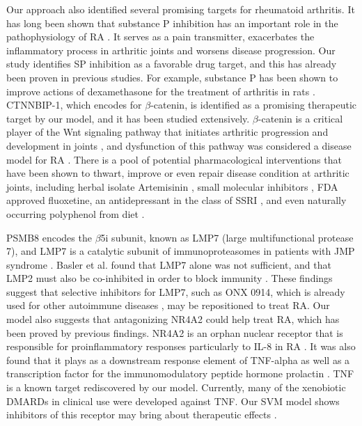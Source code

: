     Our approach also identified several promising targets for rheumatoid arthritis. It has long been shown that substance P inhibition has an important role in the pathophysiology of RA \cite{lisowska2015substance,garrett1992role,green2005gastrin,keeble2004role,lotz1987substance,okamura2017dual,lam1990mediators,lam1991neurogenic}. It serves as a pain transmitter, exacerbates the inflammatory process in arthritic joints and worsens disease progression. Our study identifies SP inhibition as a favorable drug target, and this has already been proven in previous studies. For example, substance P has been shown to improve actions of dexamethasone for the treatment of arthritis in rats \cite{lam2010substance}. CTNNBIP-1, which encodes for $\beta$-catenin, is identified as a promising therapeutic target by our model, and it has been studied extensively. $\beta$-catenin is a critical player of the Wnt signaling pathway that initiates arthritic progression and development in joints \cite{sen2005wnt,zhou2017wnt}, and dysfunction of this pathway was considered a disease model for RA \cite{wu2010beta,zhou2017wnt}. There is a pool of potential pharmacological interventions that have been shown to thwart, improve or even repair disease condition at arthritic joints, including herbal isolate Artemisinin \cite{zhong2018artemisinin}, small molecular inhibitors \cite{lietman2018inhibition,landman2013small,landman2013small,dell2017pharmacological}, FDA approved fluoxetine, an antidepressant in the class of SSRI \cite{miyamoto2017fluoxetine}, and even naturally occurring polyphenol from diet \cite{li2018resveratrol}. 
    
    PSMB8 encodes the $\beta$5i subunit, known as LMP7 (large multifunctional protease 7), and LMP7 is a catalytic subunit of immunoproteasomes in patients with JMP syndrome \cite{agarwal2010psmb8}. Basler et al. found that LMP7 alone was not sufficient, and that LMP2 must also be co-inhibited in order to block immunity \cite{basler2018co}. These findings suggest that selective inhibitors for LMP7, such as ONX 0914, which is already used for other autoimmune diseases \cite{althof2018immunoproteasome,liu2017onx,verbrugge2012targeting}, may be repositioned to treat RA. Our model also suggests that antagonizing NR4A2 could help treat RA, which has been proved by previous findings. NR4A2 is an orphan nuclear receptor that is responsible for proinflammatory responses particularly to IL-8 in RA \cite{aherne2009identification}. It was also found that it plays as a downstream response element of TNF-alpha \cite{mix2012orphan} as well as a transcription factor for the immunomodulatory peptide hormone prolactin \cite{mccoy2015orphan}. TNF is a known target rediscovered by our model. Currently, many of the xenobiotic DMARDs in clinical use were developed against TNF. Our SVM model shows inhibitors of this receptor may bring about therapeutic effects \cite{aletaha2018diagnosis}.
  
